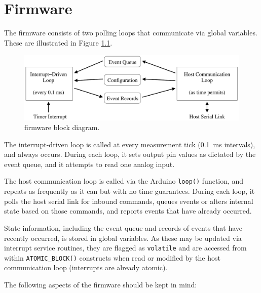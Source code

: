 %

\chapter{Firmware}
\label{sect-software}

The {\projectname} firmware consists of two polling loops that communicate 
via global variables. These are illustrated in Figure \ref{fig-firmware}.

\begin{figure}[h]
\begin{center}
\includegraphics[width=0.9\columnwidth]{figs/firmware.pdf}
\end{center}
\caption{{\projectname} firmware block diagram.}\label{fig-firmware}
\end{figure}

The interrupt-driven loop is called at every measurement tick (0.1~ms 
intervals), and always occurs. During each loop, it sets output pin values 
as dictated by the event queue, and it attempts to read one analog input.

The host communication loop is called via the Arduino \texttt{loop()} 
function, and repeats as frequently as it can but with no time guarantees. 
During each loop, it polls the host serial link for inbound commands, 
queues events or alters internal state based on those commands, and 
reports events that have already occurred.

State information, including the event queue and records of events that 
have recently occurred, is stored in global variables. As these may be 
updated via interrupt service routines, they are flagged as 
\texttt{volatile} and are accessed from within \texttt{ATOMIC\_BLOCK()} 
constructs when read or modified by the host communication loop 
(interrupts are already atomic).

The following aspects of the firmware should be kept in mind:


